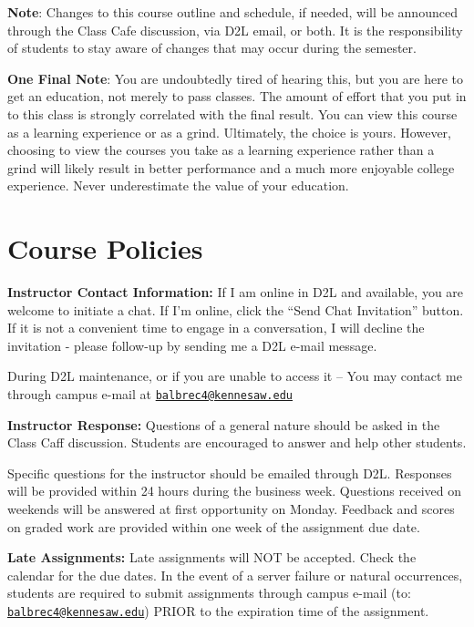 \documentclass[11pt,]{article}
\begin{document}
\textbf{Note}: Changes to this course outline and schedule, if needed, will be announced through the Class Cafe
discussion, via D2L email, or both. It is the responsibility of students to stay aware of changes that may occur
during the semester.

\textbf{One Final Note}: You are undoubtedly tired of hearing this, but you are here to get an education, not merely
to pass classes. The amount of effort that you put in to this class is strongly correlated with the final result. You can view this course as a learning experience or as a grind. Ultimately, the choice is yours. However, choosing to
view the courses you take as a learning experience rather than a grind will likely result in better performance and
a much more enjoyable college experience. Never underestimate the value of your education.

\hypertarget{course-policies}{%
\section{Course Policies}\label{course-policies}}

\textbf{Instructor Contact Information:} If I am online in D2L and available, you are welcome to initiate a chat. If I'm
online, click the ``Send Chat Invitation'' button. If it is not a convenient time to engage in a conversation, I will
decline the invitation - please follow-up by sending me a D2L e-mail message.

During D2L maintenance, or if you are unable to access it -- You may contact me through campus e-mail at
\href{mailto:balbrec4@kennesaw.edu}{\nolinkurl{balbrec4@kennesaw.edu}}

\textbf{Instructor Response:} Questions of a general nature should be asked in the Class Caff discussion.
Students are encouraged to answer and help other students.

Specific questions for the instructor should be emailed through D2L. Responses will be provided within 24 hours during
the business week. Questions received on weekends will be answered at first opportunity on Monday. Feedback and
scores on graded work are provided within one week of the assignment due date.

\textbf{Late Assignments:} Late assignments will NOT be accepted. Check the calendar for the due dates. In the event of a
server failure or natural occurrences, students are required to submit assignments through campus e-mail (to:
\href{mailto:balbrec4@kennesaw.edu}{\nolinkurl{balbrec4@kennesaw.edu}}) PRIOR to the expiration time of the assignment.
\end{document}

